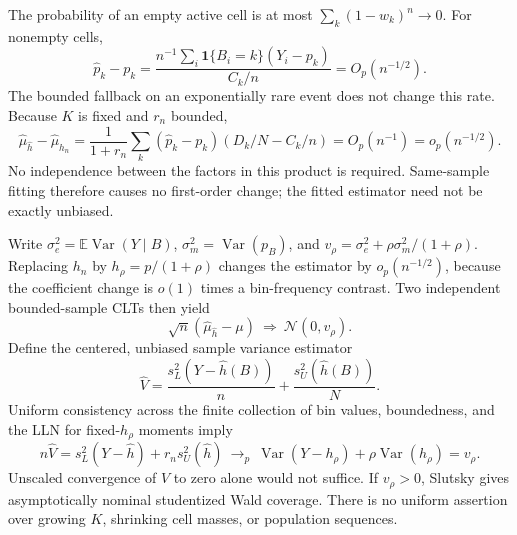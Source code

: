 \documentclass{article}
\newcommand{\E}{\mathbb E}
\newcommand{\Var}{\operatorname{Var}}
\begin{document}
The probability of an empty active cell is at most $\sum_k(1-w_k)^n\to0$. For nonempty cells,
\begin{equation}\label{eq:nuisance}
 \widehat p_k-p_k=\frac{n^{-1}\sum_i\mathbf1\{B_i=k\}(Y_i-p_k)}{C_k/n}=O_p(n^{-1/2}).
\end{equation}
The bounded fallback on an exponentially rare event does not change this rate. Because $K$ is fixed and $r_n$ bounded,
\begin{equation}\label{eq:remainder}
 \widehat\mu_{\widehat h}-\widehat\mu_{h_n}
 =\frac{1}{1+r_n}\sum_k(\widehat p_k-p_k)(D_k/N-C_k/n)
 =O_p(n^{-1})=o_p(n^{-1/2}).
\end{equation}
No independence between the factors in this product is required. Same-sample fitting therefore causes no first-order change; the fitted estimator need not be exactly unbiased.

Write $\sigma_e^2=\E\Var(Y\mid B)$, $\sigma_m^2=\Var(p_B)$, and $v_\rho=\sigma_e^2+\rho\sigma_m^2/(1+\rho)$. Replacing $h_n$ by $h_\rho=p/(1+\rho)$ changes the estimator by $o_p(n^{-1/2})$, because the coefficient change is $o(1)$ times a bin-frequency contrast. Two independent bounded-sample CLTs then yield
\begin{equation}\label{eq:binclt}
 \sqrt n(\widehat\mu_{\widehat h}-\mu)\ \Rightarrow\ \mathcal N(0,v_\rho).
\end{equation}
Define the centered, unbiased sample variance estimator
\begin{equation}\label{eq:variance}
 \widehat V=\frac{s_L^2(Y-\widehat h(B))}{n}+\frac{s_U^2(\widehat h(B))}{N}.
\end{equation}
Uniform consistency across the finite collection of bin values, boundedness, and the LLN for fixed-$h_\rho$ moments imply
\begin{equation}\label{eq:scaledconsistency}
 n\widehat V=s_L^2(Y-\widehat h)+r_ns_U^2(\widehat h)\ \to_p\
 \Var(Y-h_\rho)+\rho\Var(h_\rho)=v_\rho.
\end{equation}
Unscaled convergence of $\widehat V$ to zero alone would not suffice. If $v_\rho>0$, Slutsky gives asymptotically nominal studentized Wald coverage. There is no uniform assertion over growing $K$, shrinking cell masses, or population sequences.
\end{document}
